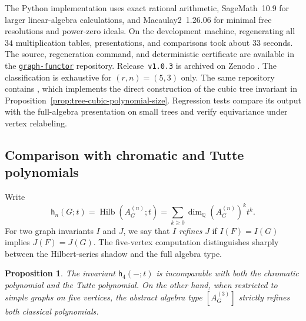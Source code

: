 \documentclass[11pt]{amsart}
\theoremstyle{plain}
\newtheorem{proposition}[theorem]{Proposition}
\theoremstyle{definition}
\theoremstyle{remark}
\newcommand{\Q}{\mathbb{Q}}
\begin{document}
The Python implementation uses exact rational arithmetic, SageMath~10.9 for
larger linear-algebra calculations, and Macaulay2~1.26.06 for minimal free
resolutions and power-zero ideals.  On the development machine, regenerating
all $34$ multiplication tables, presentations, and comparisons took about
$33$ seconds.  The source, regeneration command, and deterministic certificate
 are available in the
\href{https://github.com/jacksonwalters/graph-functor}{\texttt{graph-functor}}
repository.  Release~\texttt{v1.0.3} is archived on Zenodo
\cite{WaltersGraphFunctorSoftware}.
The classification is exhaustive for $(r,n)=(5,3)$ only.
The same repository contains , which implements
the direct construction of the cubic tree invariant in
Proposition~\ref{prop:tree-cubic-polynomial-size}.  Regression tests compare
its output with the full-algebra presentation on small trees and verify
equivariance under vertex relabeling.

\subsection{Comparison with chromatic and Tutte polynomials}

Write
\[
  \mathsf h_n(G;t)=\operatorname{Hilb}(A_G^{(n)};t)
  =\sum_{k\geq0}\dim_{\Q}(A_G^{(n)})^k t^k.
\]
For two graph invariants $I$ and $J$, we say that $I$ \emph{refines} $J$ if
$I(F)=I(G)$ implies $J(F)=J(G)$.  The five-vertex computation distinguishes
sharply between the Hilbert-series shadow and the full algebra type.

\begin{proposition}\label{prop:classical-incomparability}
The invariant $\mathsf h_4(-;t)$ is incomparable with both the chromatic
polynomial and the Tutte polynomial.  On the other hand, when restricted to
simple graphs on five vertices, the abstract algebra type $[A_G^{(3)}]$
strictly refines both classical polynomials.
\end{proposition}
\end{document}
